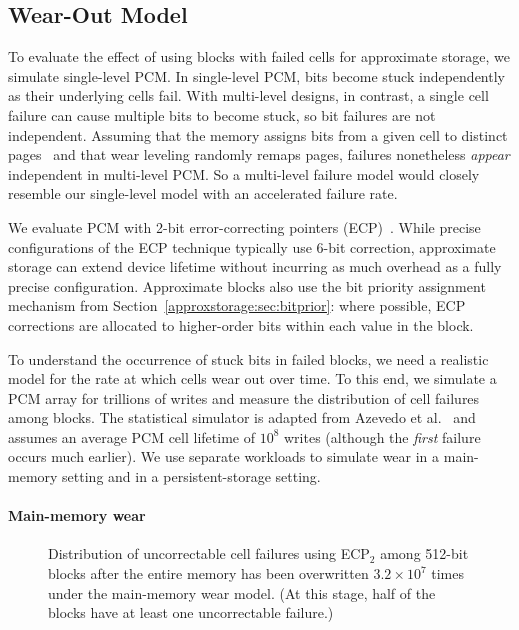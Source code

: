 \subsection{Wear-Out Model}
\label{approxstorage:sec:wearmodel}

To evaluate the effect of using blocks with failed cells for approximate
storage, we simulate single-level PCM.
In single-level PCM,
bits become
stuck independently as their underlying cells fail.
With multi-level designs, in contrast, a single cell failure can cause
multiple bits to become stuck, so bit failures are not independent.
Assuming that the memory assigns bits from a given cell to distinct
pages~\cite{mlcflash} and that wear leveling randomly remaps pages,
failures nonetheless \emph{appear} independent in multi-level PCM.
So a multi-level
failure model would closely resemble our single-level model with an
accelerated failure rate.

We evaluate PCM with 2-bit error-correcting pointers (ECP)~\cite{ecp}.
While precise configurations of the ECP technique typically use 6-bit
correction, approximate storage can extend device lifetime without incurring as
much overhead as a fully precise configuration.
Approximate blocks also use the bit priority assignment mechanism from
Section~\ref{approxstorage:sec:bitprior}: where possible, ECP corrections are allocated to
higher-order bits within each value in the block.

To understand the occurrence of stuck bits in failed blocks,
we need a realistic model for the rate at which cells wear out over time.
To this end,
we simulate a PCM array for trillions of writes and
measure the distribution of cell failures among blocks.
The statistical simulator is adapted from Azevedo et al.~\cite{zombie} and
assumes an average PCM cell lifetime of $10^8$ writes (although
the \emph{first} failure occurs much earlier).
We use separate
workloads to simulate wear in a main-memory setting and in a persistent-storage
setting.

\paragraph{Main-memory wear}

\begin{figure}[t]
    \centering
    
    \caption{
        Distribution of uncorrectable cell failures using ECP$_2$ among
        512-bit blocks
        after the entire memory has been overwritten
        $3.2 \times 10^{7}$ times under the main-memory wear model. (At this
        stage, half of the blocks have at least one uncorrectable failure.)
    }
    \label{approxstorage:fig:hist}
\end{figure}

